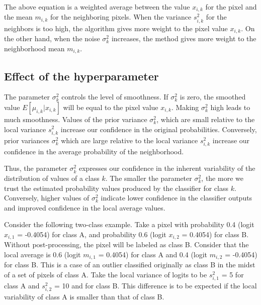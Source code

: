 \documentclass[
]{jss}
\begin{document}
The above equation is a weighted average between the value \(x_{i,k}\) for the pixel
and the mean \(m_{i,k}\) for the neighboring pixels. When the variance \(s^2_{i,k}\) for the
neighbors is too high, the algorithm gives more weight to the pixel value \(x_{i,k}\).
On the other hand, when the noise \(\sigma^2_k\) increases, the method gives more weight
to the neighborhood mean \(m_{i,k}\).

\newpage

\hypertarget{effect-of-the-hyperparameter}{%
\subsection{Effect of the hyperparameter}\label{effect-of-the-hyperparameter}}

The parameter \(\sigma^2_k\) controls the level of smoothness. If \(\sigma^2_k\) is zero,
the smoothed value \({E}[\mu_{i,k} | x_{i,k}]\) will be equal to the pixel value \(x_{i,k}\).
Making \(\sigma^2_k\) high leads to much smoothness. Values of the prior variance
\(\sigma^2_{k}\), which are small relative to the local variance \(s^2_{i,k}\) increase our
confidence in the original probabilities. Conversely, prior variances \(\sigma^2_{k}\)
which are large relative to the local variance \(s^2_{i,k}\) increase our confidence in
the average probability of the neighborhood.

Thus, the parameter \(\sigma^2_{k}\) expresses our confidence in the inherent variability
of the distribution of values of a class \(k\). The smaller the parameter \(\sigma^2_{k}\),
the more we trust the estimated probability values produced by the classifier for class \(k\).
Conversely, higher values of \(\sigma^2_{k}\) indicate lower confidence in the classifier
outputs and improved confidence in the local average values.

Consider the following two-class example. Take a pixel with probability 0.4
(logit \(x_{i,1}\) = -0.4054) for class A, and probability 0.6 (logit \(x_{i,2}\) = 0.4054)
for class B. Without post-processing, the pixel will be labeled as class B. Consider that
the local average is 0.6 (logit \(m_{i,1}\) = 0.4054) for class A and 0.4
(logit \(m_{i,2}\) = -0.4054) for class B. This is a case of an outlier classified
originally as class B in the midst of a set of pixels of class A. Take the local variance
of logits to be \(s^2_{i,1}\) = 5 for class A and \(s^2_{i,2}\) = 10 and for class B.
This difference is to be expected if the local variability of class A is smaller
than that of class B.
\end{document}
